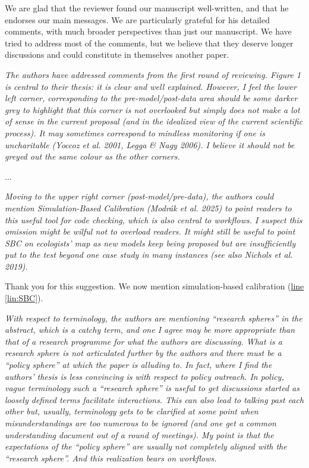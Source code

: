 \documentclass[11pt,letter]{article}
\begin{document}
We are glad that the reviewer found our manuscript well-written, and that he endorses our main messages. We are particularly grateful for his detailed comments, with much broader perspectives than just our manuscript. We have tried to address most of the comments, but we believe that they deserve longer discussions and could constitute in themselves another paper.

\begin{mybox}
\emph{The authors have addressed comments from the first round of reviewing. Figure 1 is central to their thesis: it is clear and well explained. However, I feel the lower left corner, corresponding to the pre-model/post-data area should be some darker grey to highlight that this corner is not overlooked but simply does not make a lot of sense in the current proposal (and in the idealized view of the current scientific process). It may sometimes correspond to mindless monitoring if one is uncharitable (Yoccoz et al. 2001, Legga \& Nagy 2006). I believe it should not be greyed out the same colour as the other corners.}  
\end{mybox}

...

\begin{mybox}
\emph{Moving to the upper right corner (post-model/pre-data), the authors could mention
Simulation-Based Calibration (Modrák et al. 2025) to point readers to this useful tool for code
checking, which is also central to workflows. I suspect this omission might be wilful not to
overload readers. It might still be useful to point SBC on ecologists’ map as new models keep
being proposed but are insufficiently put to the test beyond one case study in many instances
(see also Nichols et al. 2019).}  
\end{mybox}

Thank you for this suggestion. We now mention simulation-based calibration (\href{file:forecastflows_r2\#lintarget:SBC}{line \ref*{lin:SBC}}).

\begin{mybox}
\emph{With respect to terminology, the authors are mentioning “research spheres” in the abstract,
which is a catchy term, and one I agree may be more appropriate than that of a research
programme for what the authors are discussing. What is a research sphere is not articulated
further by the authors and there must be a “policy sphere” at which the paper is alluding to. In
fact, where I find the authors’ thesis is less convincing is with respect to policy outreach. In
policy, vague terminology such a “research sphere” is useful to get discussions started as
loosely defined terms facilitate interactions. This can also lead to talking past each other but,
usually, terminology gets to be clarified at some point when misunderstandings are too
numerous to be ignored (and one get a common understanding document out of a round of
meetings). My point is that the expectations of the “policy sphere” are usually not completely
aligned with the “research sphere”. And this realization bears on workflows.}  
\end{mybox}
\end{document}
